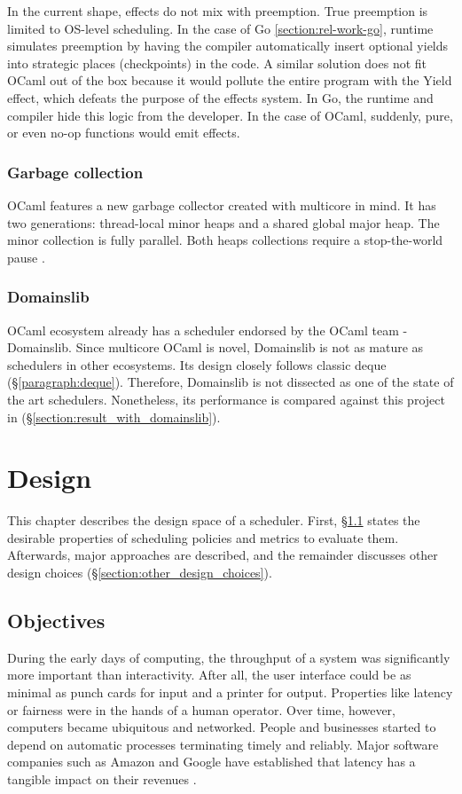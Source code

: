 \documentclass[12pt,a4paper,twoside]{report}
\begin{document}
\label{paragraph:ocaml_preemption}
In the current shape, effects do not mix with preemption. True preemption is limited to OS-level scheduling. In the case of Go \ref{section:rel-work-go}, runtime simulates preemption by having the compiler automatically insert optional yields into strategic places (checkpoints) in the code. A similar solution does not fit OCaml out of the box because it would pollute the entire program with the Yield effect, which defeats the purpose of the effects system. In Go, the runtime and compiler hide this logic from the developer. In the case of OCaml, suddenly, pure, or even no-op functions would emit effects.

\subsection{Garbage collection}
\label{section:gc}
OCaml features a new garbage collector created with multicore in mind. It has two generations: thread-local minor heaps and a shared global major heap. The minor collection is fully parallel. Both heaps collections require a stop-the-world pause \cite{Sivaramakrishnan2020}.


\subsection{Domainslib}

OCaml ecosystem already has a scheduler endorsed by the OCaml team \cite{ocamlmul59:online} - Domainslib. Since multicore OCaml is novel, Domainslib is not as mature as schedulers in other ecosystems. Its design closely follows classic deque (\S\ref{paragraph:deque}). Therefore, Domainslib is not dissected as one of the state of the art schedulers. Nonetheless, its performance is compared against this project in (\S\ref{section:result_with_domainslib}).

\chapter{Design}
This chapter describes the design space of a scheduler. First,  \S\ref{section:objectives} states the desirable properties of scheduling policies and metrics to evaluate them. Afterwards, major approaches are described, and the remainder discusses other design choices (\S\ref{section:other_design_choices}).

\section{Objectives}
\label{section:objectives}
During the early days of computing, the throughput of a system was significantly more important than interactivity. After all, the user interface could be as minimal as punch cards for input and a printer for output. Properties like latency or fairness were in the hands of a human operator. Over time, however, computers became ubiquitous and networked. People and businesses started to depend on automatic processes terminating timely and reliably. Major software companies such as Amazon and Google have established that latency has a tangible impact on their revenues \cite{Kleppmann2017-en}.
\end{document}

